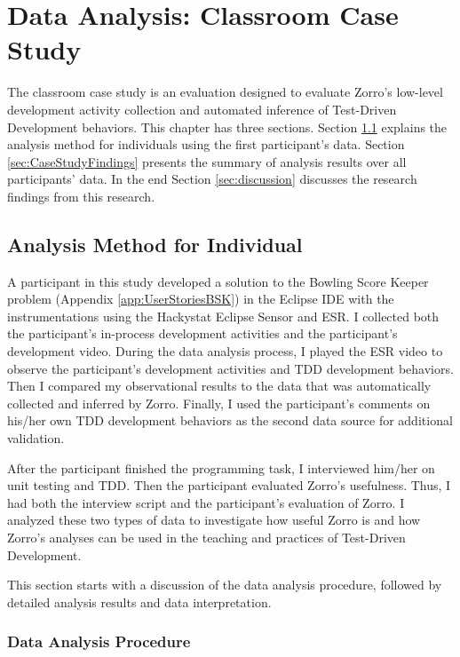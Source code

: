 \chapter{Data Analysis: Classroom Case Study}
\label{ch:ClassroomDataAnalysis}
The classroom case study is an evaluation designed to evaluate Zorro's
low-level development activity collection and automated inference
of Test-Driven Development behaviors. This chapter has three
sections. Section \ref{sec:CaseStudyMethod} explains the analysis
method for individuals using the first participant's data. Section
\ref{sec:CaseStudyFindings} presents the summary of analysis results
over all participants' data. In the end Section \ref{sec:discussion}
discusses the research findings from this research.

\section{Analysis Method for Individual}
\label{sec:CaseStudyMethod}

A participant in this study developed a solution to the Bowling Score
Keeper problem (Appendix \ref{app:UserStoriesBSK}) in the Eclipse IDE
with the instrumentations using the Hackystat Eclipse Sensor and
ESR. I collected both the participant's in-process development
activities and the participant's development video. During the data
analysis process, I played the ESR video to observe the participant's
development activities and TDD development behaviors. Then I compared
my observational results to the data that was automatically collected
and inferred by Zorro. Finally, I used the participant's comments on
his/her own TDD development behaviors as the second data source for
additional validation.

After the participant finished the programming task, I interviewed
him/her on unit testing and TDD. Then the participant evaluated
Zorro's usefulness. Thus, I had both the interview script and the
participant's evaluation of Zorro. I analyzed these two types of data
to investigate how useful Zorro is and how Zorro's analyses can be
used in the teaching and practices of Test-Driven Development.

This section starts with a discussion of the data analysis procedure,
followed by detailed analysis results and data interpretation.

\subsection{Data Analysis Procedure}

